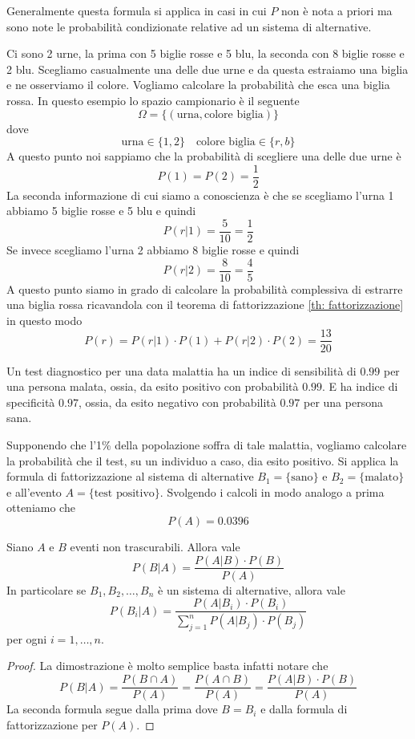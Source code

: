 Generalmente questa formula si applica in casi in cui $P$ non è nota a priori ma sono note le
probabilità condizionate relative ad un sistema di alternative.

\begin{example}
	Ci sono 2 urne, la prima con 5 biglie rosse e 5 blu, la seconda con 8 biglie rosse e 2 blu.
	Scegliamo casualmente una delle due urne e da questa estraiamo una biglia e ne osserviamo il
	colore. Vogliamo calcolare la probabilità che esca una biglia rossa. In questo esempio lo
	spazio campionario è il seguente
	\[ \Omega = \{ (\text{urna}, \text{colore biglia}) \} \]
	dove
	\[ \text{urna} \in \{ 1, 2 \} \quad \text{colore biglia} \in \{ r, b \} \]
	A questo punto noi sappiamo che la probabilità di scegliere una delle due urne è
	\[ P(1) = P(2) = \frac{1}{2} \]
	La seconda informazione di cui siamo a conoscienza è che se scegliamo l'urna 1 abbiamo 5
	biglie rosse e 5 blu e quindi
	\[ P(r | 1) = \frac{5}{10} = \frac{1}{2} \]
	Se invece scegliamo l'urna 2 abbiamo 8 biglie rosse e quindi
	\[ P(r | 2) = \frac{8}{10} = \frac{4}{5} \]
	A questo punto siamo in grado di calcolare la probabilità complessiva di estrarre una biglia
	rossa ricavandola con il teorema di fattorizzazione \ref{th: fattorizzazione} in questo modo
	\[ P(r) = P(r | 1) \cdot P(1) + P(r | 2) \cdot P(2) = \frac{13}{20} \]
\end{example}

\begin{example}
	Un test diagnostico per una data malattia ha un indice di sensibilità di $0.99$ per una
	persona malata, ossia, da esito positivo con probabilità $0.99$. E ha indice di specificità
	$0.97$, ossia, da esito negativo con probabilità $0.97$ per una persona sana.

	Supponendo che l'1\% della popolazione soffra di tale malattia, vogliamo calcolare la
	probabilità che il test, su un individuo a caso, dia esito positivo. Si applica la formula di
	fattorizzazione al sistema di alternative $B_1 = \{ \text{sano} \}$ e
	$B_2 = \{ \text{malato} \}$ e all'evento $A = \{ \text{test positivo} \}$. Svolgendo i calcoli
	in modo analogo a prima otteniamo che
	\[ P(A) = 0.0396 \]
\end{example}

\begin{theorem}[Bayes]\label{th: bayes}
	Siano $A$ e $B$ eventi non trascurabili. Allora vale
	\[ P(B | A) = \frac{P(A | B) \cdot P(B)}{P(A)} \]
	In particolare se $B_1, B_2, \dots, B_n$ è un sistema di alternative, allora vale
	\[
		P(B_i | A) = \frac{P(A | B_i) \cdot
			P(B_i)}{\displaystyle\sum_{j=1}^n P(A | B_j) \cdot P(B_j)}
	\]
	per ogni $i = 1, \dots, n$.
	\begin{proof}
		La dimostrazione è molto semplice basta infatti notare che
		\[
			P(B | A) = \frac{P(B \cap A)}{P(A)} =
			\frac{P(A \cap B)}{P(A)} = \frac{P(A | B) \cdot P(B)}{P(A)}
		\]
		La seconda formula segue dalla prima dove $B=B_i$ e dalla formula di fattorizzazione
		per $P(A)$.
	\end{proof}
\end{theorem}

